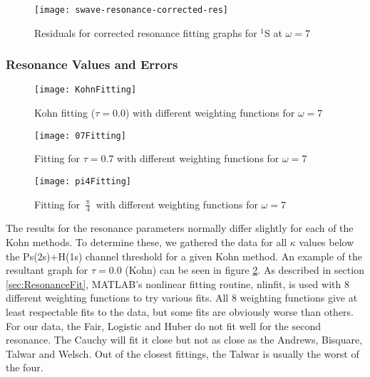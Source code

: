 \documentclass[Dissertation.tex]{subfiles}
\begin{document}
\begin{figure}[H]
	\centering
	\texttt{[image: swave-resonance-corrected-res]}
	\caption{Residuals for corrected resonance fitting graphs for $^1$S at $\omega = 7$}
	\label{fig:swave-resonance-corrected-res}
\end{figure}




\subsubsection{Resonance Values and Errors}
\label{sec:ResonanceErrors}

\begin{figure}[H]
	\centering
	\texttt{[image: KohnFitting]}
	\caption{Kohn fitting ($\tau = 0.0$) with different weighting functions for $\omega = 7$}
	\label{fig:KohnFitting}
\end{figure}

\begin{figure}[H]
	\centering
	\texttt{[image: 07Fitting]}
	\caption{Fitting for $\tau = 0.7$ with different weighting functions for $\omega = 7$}
	\label{fig:07Fitting}
\end{figure}

\begin{figure}[H]
	\centering
	\texttt{[image: pi4Fitting]}
	\caption[Fitting for $\uppi/4$ with different weighting functions for $\omega = 7$]{Fitting for $\frac{\uppi}{4}$ with different weighting functions for $\omega = 7$}
	\label{fig:pi4Fitting}
\end{figure}

The results for the resonance parameters normally differ slightly for each of the Kohn methods.  To determine these, we gathered the data for all $\kappa$ values below the Ps(2s)+H(1s) channel threshold for a given Kohn method.  An example of the resultant graph for $\tau = 0.0$ (Kohn) can be seen in figure \ref{fig:KohnFitting}.  As described in section \ref{sec:ResonanceFit}, MATLAB's nonlinear fitting routine, nlinfit, is used with 8 different weighting functions to try various fits.  All 8 weighting functions give at least respectable fits to the data, but some fits are obviously worse than others.  For our data, the Fair, Logistic and Huber do not fit well for the second resonance.  The Cauchy will fit it close but not as close as the Andrews, Bisquare, Talwar and Welsch.  Out of the closest fittings, the Talwar is usually the worst of the four.
\end{document}
